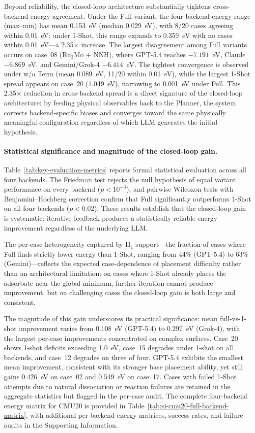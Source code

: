 Beyond reliability, the closed-loop architecture substantially tightens cross-backend energy agreement.
Under the Full variant, the four-backend energy range (max--min) has mean 0.153~eV (median 0.029~eV), with 8/20 cases agreeing within 0.01~eV; under 1-Shot, this range expands to 0.359~eV with no cases within 0.01~eV---a 2.35$\times$ increase.
The largest disagreement among Full variants occurs on case~08 (Ru$_3$Mo + NNH), where GPT-5.4 reaches $-7.191$~eV, Claude $-6.869$~eV, and Gemini/Grok-4 $-6.414$~eV.
The tightest convergence is observed under w/o Term (mean 0.089~eV, 11/20 within 0.01~eV), while the largest 1-Shot spread appears on case~20 (1.049~eV), narrowing to 0.001~eV under Full.
This 2.35$\times$ reduction in cross-backend spread is a direct signature of the closed-loop architecture: by feeding physical observables back to the Planner, the system corrects backend-specific biases and converges toward the same physically meaningful configuration regardless of which LLM generates the initial hypothesis.

\paragraph{Statistical significance and magnitude of the closed-loop gain.}
Table~\ref{tab:key-evaluation-metrics} reports formal statistical evaluation across all four backends.
The Friedman test rejects the null hypothesis of equal variant performance on every backend ($p < 10^{-3}$), and pairwise Wilcoxon tests with Benjamini--Hochberg correction confirm that Full significantly outperforms 1-Shot on all four backends ($p < 0.02$).
These results establish that the closed-loop gain is systematic: iterative feedback produces a statistically reliable energy improvement regardless of the underlying LLM.

The per-case heterogeneity captured by H$_1$ support---the fraction of cases where Full finds strictly lower energy than 1-Shot, ranging from 44\% (GPT-5.4) to 63\% (Gemini)---reflects the expected case-dependence of placement difficulty rather than an architectural limitation: on cases where 1-Shot already places the adsorbate near the global minimum, further iteration cannot produce improvement, but on challenging cases the closed-loop gain is both large and consistent.

The magnitude of this gain underscores its practical significance: mean full-vs-1-shot improvement varies from 0.108~eV (GPT-5.4) to 0.297~eV (Grok-4), with the largest per-case improvements concentrated on complex surfaces.
Case~20 shows 1-shot deficits exceeding 1.0~eV, case~15 degrades under 1-shot on all backends, and case~12 degrades on three of four.
GPT-5.4 exhibits the smallest mean improvement, consistent with its stronger base placement ability, yet still gains 0.426~eV on case~02 and 0.549~eV on case~17.
Cases with failed 1-Shot attempts due to natural dissociation or reaction failures are retained in the aggregate statistics but flagged in the per-case audit.
The complete four-backend energy matrix for CMU20 is provided in Table~\ref{tab:si-cmu20-full-backend-matrix}, with additional per-backend energy matrices, success rates, and failure audits in the Supporting Information.


